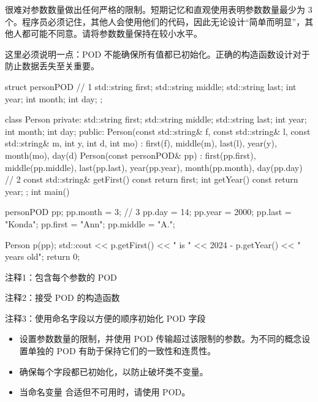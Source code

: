 很难对参数数量做出任何严格的限制。短期记忆和直观使用表明参数数量最少为 3 个。程序员必须记住，其他人会使用他们的代码，因此无论设计“简单而明显”，其他人都可能不同意。请将参数数量保持在较小水平。

这里必须说明一点：POD 不能确保所有值都已初始化。正确的构造函数设计对于防止数据丢失至关重要。


\begin{cpp}
struct personPOD { // 1
  std::string first;
  std::string middle;
  std::string last;
  int year;
  int month;
  int day;
};

class Person {
private:
  std::string first;
  std::string middle;
  std::string last;
  int year;
  int month;
  int day;
public:
  Person(const std::string& f, const std::string& l, const std::string& m,
      int y, int d, int mo) :
    first(f), middle(m), last(l), year(y), month(mo), day(d) {}
  Person(const personPOD& pp) : first(pp.first), middle(pp.middle),
    last(pp.last), year(pp.year), month(pp.month),
    day(pp.day) {} // 2
  const std::string& getFirst() const { return first; }
  int getYear() const { return year; }
};
int main() {
  personPOD pp;
  pp.month = 3; // 3
  pp.day = 14;
  pp.year = 2000;
  pp.last = "Konda";
  pp.first = "Ann";
  pp.middle = "A.";

  Person p(pp);
  std::cout << p.getFirst() << " is " << 2024 - p.getYear() << " years old\n";
  return 0;
}
\end{cpp}

{\footnotesize
注释1：包含每个参数的 POD

注释2：接受 POD 的构造函数

注释3：使用命名字段以方便的顺序初始化 POD 字段
}


\begin{itemize}
\item
设置参数数量的限制，并使用 POD 传输超过该限制的参数。为不同的概念设置单独的 POD 有助于保持它们的一致性和连贯性。

\item
确保每个字段都已初始化，以防止破坏类不变量。

\item
当命名变量 合适但不可用时，请使用 POD。
\end{itemize}
















